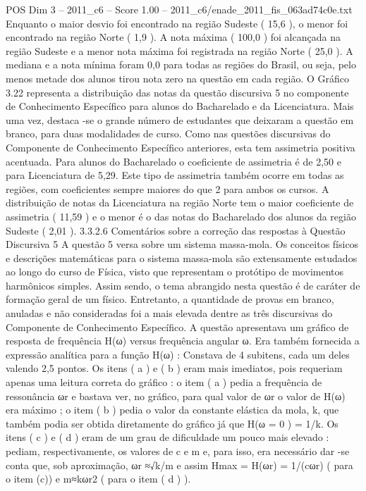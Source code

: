 \begin{textsample}{POS Dim 3 – 2011\_c6 – Score 1.00 – 2011\_c6/enade\_2011\_fis\_063ad74c0e.txt}
Enquanto o maior desvio foi encontrado na região Sudeste ( 15,6 ), o menor foi encontrado na região Norte ( 1,9 ).
A nota máxima ( 100,0 ) foi alcançada na região Sudeste e a menor nota máxima foi registrada na região Norte ( 25,0 ).
A mediana e a nota mínima foram 0,0 para todas as regiões do Brasil, ou seja, pelo menos metade dos alunos tirou nota zero na questão em cada região.
O Gráfico 3.22 representa a distribuição das notas da questão discursiva 5 no componente de Conhecimento Específico para alunos do Bacharelado e da Licenciatura.
Mais uma vez, destaca -se o grande número de estudantes que deixaram a questão em branco, para duas modalidades de curso.
Como nas questões discursivas do Componente de Conhecimento Específico anteriores, esta tem assimetria positiva acentuada.
Para alunos do Bacharelado o coeficiente de assimetria é de 2,50 e para Licenciatura de 5,29.
Este tipo de assimetria também ocorre em todas as regiões, com coeficientes sempre maiores do que 2 para ambos os cursos.
A distribuição de notas da Licenciatura na região Norte tem o maior coeficiente de assimetria ( 11,59 ) e o menor é o das notas do Bacharelado dos alunos da região Sudeste ( 2,01 ). 3.3.2.6 Comentários sobre a correção das respostas à Questão Discursiva 5 A questão 5 versa sobre um sistema massa-mola.
Os conceitos físicos e descrições matemáticas para o sistema massa-mola são extensamente estudados ao longo do curso de Física, visto que representam o protótipo de movimentos harmônicos simples.
Assim sendo, o tema abrangido nesta questão é de caráter de formação geral de um físico.
Entretanto, a quantidade de provas em branco, anuladas e não consideradas foi a mais elevada dentre as três discursivas do Componente de Conhecimento Específico.
A questão apresentava um gráfico de resposta de frequência H(ω) versus frequência angular ω.
Era também fornecida a expressão analítica para a função H(ω) : Constava de 4 subitens, cada um deles valendo 2,5 pontos.
Os itens ( a ) e ( b ) eram mais imediatos, pois requeriam apenas uma leitura correta do gráfico : o item ( a ) pedia a frequência de ressonância ωr e bastava ver, no gráfico, para qual valor de ωr o valor de H(ω) era máximo ; o item ( b ) pedia o valor da constante elástica da mola, k, que também podia ser obtida diretamente do gráfico já que H(ω = 0 ) = 1/k.
Os itens ( c ) e ( d ) eram de um grau de dificuldade um pouco mais elevado : pediam, respectivamente, os valores de c e m e, para isso, era necessário dar -se conta que, sob aproximação, ωr ≈√k/m e assim Hmax = H(ωr) = 1/(cωr) ( para o item (c)) e m≈kωr2 ( para o item ( d ) ).

\end{textsample}
